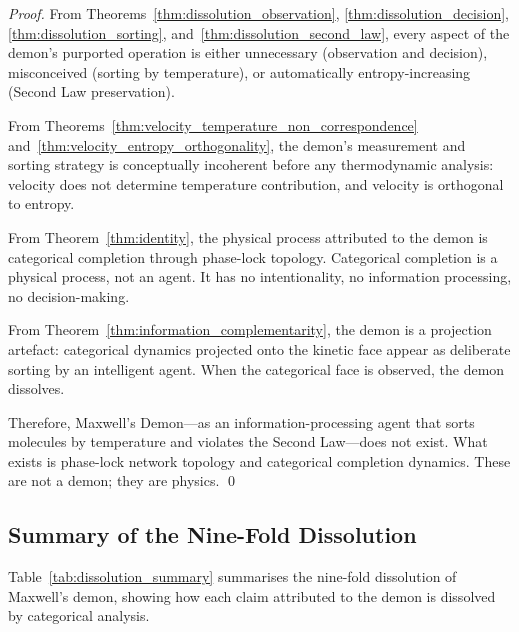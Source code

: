 \documentclass[12pt,a4paper]{article}
\theoremstyle{definition}
\theoremstyle{remark}
\begin{document}
\begin{proof}
From Theorems~\ref{thm:dissolution_observation}, \ref{thm:dissolution_decision}, \ref{thm:dissolution_sorting}, and~\ref{thm:dissolution_second_law}, every aspect of the demon's purported operation is either unnecessary (observation and decision), misconceived (sorting by temperature), or automatically entropy-increasing (Second Law preservation).

From Theorems~\ref{thm:velocity_temperature_non_correspondence} and~\ref{thm:velocity_entropy_orthogonality}, the demon's measurement and sorting strategy is conceptually incoherent before any thermodynamic analysis: velocity does not determine temperature contribution, and velocity is orthogonal to entropy.

From Theorem~\ref{thm:identity}, the physical process attributed to the demon is categorical completion through phase-lock topology. Categorical completion is a physical process, not an agent. It has no intentionality, no information processing, no decision-making.

From Theorem~\ref{thm:information_complementarity}, the demon is a projection artefact: categorical dynamics projected onto the kinetic face appear as deliberate sorting by an intelligent agent. When the categorical face is observed, the demon dissolves.

Therefore, Maxwell's Demon—as an information-processing agent that sorts molecules by temperature and violates the Second Law—does not exist. What exists is phase-lock network topology and categorical completion dynamics. These are not a demon; they are physics. \qed
\end{proof}

\subsection{Summary of the Nine-Fold Dissolution}

Table~\ref{tab:dissolution_summary} summarises the nine-fold dissolution of Maxwell's demon, showing how each claim attributed to the demon is dissolved by categorical analysis.
\end{document}
